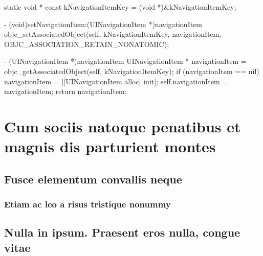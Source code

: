 \documentclass[10pt]{extarticle}
\newenvironment{tiplisting}
{\small\mdframed[middlelinewidth=0.5pt, middlelinecolor=GoldenDreamColor, skipabove=15pt]{\textbf{Tip:}}}
{\endmdframed\vspace{12pt}\normalsize}
\begin{document}
\lipsum[8]

\begin{codelisting}
static void * const kNavigationItemKey = (void *)&kNavigationItemKey;

- (void)setNavigationItem:(UINavigationItem *)navigationItem
{
    objc_setAssociatedObject(self, 
                             kNavigationItemKey, 
                             navigationItem, 
                             OBJC_ASSOCIATION_RETAIN_NONATOMIC);
}

- (UINavigationItem *)navigationItem
{
    UINavigationItem * navigationItem = objc_getAssociatedObject(self, kNavigationItemKey);
    if (navigationItem == nil) {
        navigationItem = [[UINavigationItem alloc] init];
        self.navigationItem = navigationItem;
    }
    return navigationItem;
}
\end{codelisting}

\lipsum[9]

\section{Cum sociis natoque penatibus et magnis dis parturient montes}

\begin{tiplisting}
\lipsum[10-11]
\end{tiplisting}

\subsection{Fusce elementum convallis neque}

\begin{tiplisting}
\lipsum[12-13]
\end{tiplisting}

\subsubsection{Etiam ac leo a risus tristique nonummy}

\begin{tiplisting}
\lipsum[14]
\end{tiplisting}

\subsection{Nulla in ipsum. Praesent eros nulla, congue vitae}

\lipsum[15]
\end{document}
